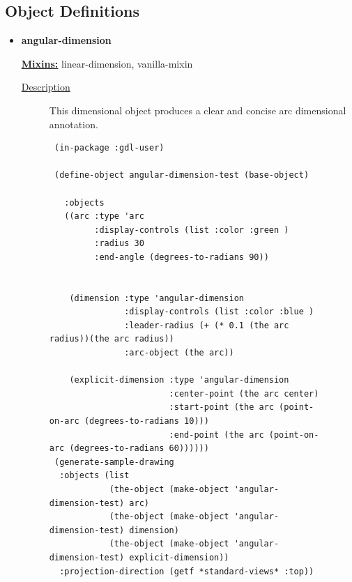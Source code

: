 \documentclass [11pt]{book}
\begin{document}
\subsection{Object Definitions}

\label{subsec:objectdefinitions}



\begin{itemize}

\item {}
\label{prim:angular-dimension}
\textbf{angular-dimension}


\textbf{
\underline{Mixins:}} linear-dimension, vanilla-mixin





\begin{description}

\item [
\underline{Description}]


This dimensional object produces a clear and concise arc dimensional annotation.



\end{description}




\begin{figure}
\begin{lrbox}{\boxedverb}
\begin{minipage}{\linewidth}
{\small

\begin{verbatim}
 (in-package :gdl-user)

 (define-object angular-dimension-test (base-object) 
   
   :objects 
   ((arc :type 'arc
         :display-controls (list :color :green )
         :radius 30
         :end-angle (degrees-to-radians 90))
    
    
    (dimension :type 'angular-dimension
               :display-controls (list :color :blue )
               :leader-radius (+ (* 0.1 (the arc radius))(the arc radius))
               :arc-object (the arc))
    
    (explicit-dimension :type 'angular-dimension
                        :center-point (the arc center)
                        :start-point (the arc (point-on-arc (degrees-to-radians 10)))
                        :end-point (the arc (point-on-arc (degrees-to-radians 60))))))
 (generate-sample-drawing 
  :objects (list 
            (the-object (make-object 'angular-dimension-test) arc) 
            (the-object (make-object 'angular-dimension-test) dimension)
            (the-object (make-object 'angular-dimension-test) explicit-dimension))
  :projection-direction (getf *standard-views* :top))
 

\end{verbatim}}
\end{minipage}
\end{lrbox}
\end{figure}
\end{itemize}
\end{document}

